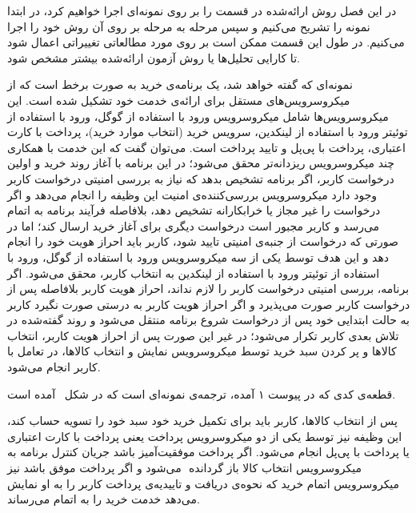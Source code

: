 
در این فصل روش ارائه‌شده در قسمت  را بر روی نمونه‌ا‌ی اجرا خواهیم کرد، در ابتدا نمونه‌ را تشریح می‌کنیم و سپس مرحله به مرحله بر روی آن روش خود را اجرا می‌کنیم. در طول این قسمت ممکن است بر روی مورد مطالعاتی تغییراتی اعمال شود تا کارایی تحلیل‌ها یا روش آزمون ارائه‌شده بیشتر مشخص شود.  \newline\newline
{}

 نمونه‌ای که گفته ‌خواهد شد، یک برنامه‌ی خرید به صورت برخط است که از میکروسرویس‌های مستقل برای ارائه‌ی خدمت خود تشکیل شده‌ است. این میکروسرویس‌ها شامل میکروسرویس ورود با استفاده از گوگل، ورود با استفاده از توئیتر ورود با استفاده از لینکدین، سرویس خرید (انتخاب موارد خرید)، پرداخت با کارت اعتباری، پرداخت با پی‌پل و تایید پرداخت است. می‌توان گفت که این خدمت با همکاری چند میکروسرویس ریزدانه‌تر محقق می‌شود؛ در این برنامه با آغاز روند خرید و اولین درخواست کاربر، اگر برنامه تشخیص بدهد که  نیاز به بررسی امنیتی درخواست کاربر وجود دارد میکروسرویس بررسی‌کننده‌ی امنیت این وظیفه را انجام می‌دهد و اگر درخواست را غیر مجاز یا خرابکارانه تشخیص دهد، بلافاصله فرآیند برنامه به اتمام می‌رسد و کاربر مجبور است درخواست دیگری برای آغاز خرید ارسال کند؛ اما در صورتی که درخواست از جنبه‌ی امنیتی تایید شود، کاربر باید احراز هویت خود را انجام دهد و این هدف توسط یکی از سه میکروسرویس ورود با استفاده از گوگل، ورود با استفاده از توئیتر ورود با استفاده از لینکدین به انتخاب کاربر، محقق می‌شود. اگر برنامه، بررسی امنیتی درخواست کاربر را لازم نداند، احراز هویت کاربر بلافاصله پس از درخواست کاربر صورت می‌پذیرد و اگر احراز هویت کاربر به درستی صورت نگیرد کاربر به حالت ابتدایی خود پس از درخواست شروع برنامه منتقل می‌شود و روند گفته‌‌شده در تلاش بعدی کاربر تکرار می‌شود؛ در غیر این صورت پس از احراز هویت کاربر، انتخاب کالاها و پر کردن سبد خرید توسط میکروسرویس نمایش و انتخاب کالاها، در تعامل با کاربر انجام می‌شود. 
 
 قطعه‌ی کدی که در پیوست ۱ آمده، ترجمه‌ی نمونه‌‌ای است که در شکل~ آمده است.

پس از انتخاب کالاها، کاربر باید برای تکمیل خرید خود سبد خود را تسویه حساب کند، این وظیفه نیز توسط یکی از دو میکروسرویس پرداخت یعنی پرداخت با کارت اعتباری یا پرداخت با پی‌پل انجام می‌شود. اگر پرداخت موفقیت‌آمیز باشد جریان کنترل برنامه به میکروسرویس انتخاب کالا باز گردانده ‌ می‌شود و اگر پرداخت موفق باشد نیز میکروسرویس اتمام خرید که نحوه‌ی دریافت و تاییدیه‌ی پرداخت کاربر را به او نمایش می‌دهد خدمت خرید را به اتمام می‌رساند.

